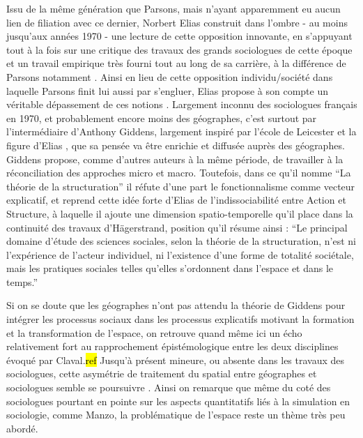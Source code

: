 Issu de la même génération que Parsons, mais n'ayant apparemment eu aucun lien de filiation avec ce dernier, Norbert Elias construit dans l'ombre - au moins jusqu'aux années 1970 - une lecture de cette opposition innovante, en s'appuyant tout à la fois sur une critique des travaux des grands sociologues de cette époque et un travail empirique très fourni tout au long de sa carrière, à la différence de Parsons notamment \autocite{Mennell1989}. Ainsi en lieu de cette opposition individu/société dans laquelle Parsons finit lui aussi par s'engluer, Elias propose à son compte un véritable dépassement de ces notions \autocite[94-101]{Heinich2002}. Largement inconnu des sociologues français en 1970, et probablement encore moins des géographes, c'est surtout par l'intermédiaire d'Anthony Giddens, largement inspiré par l'école de Leicester et la figure d'Elias \autocite[172-178]{Dunning2013}, que sa pensée va être enrichie et diffusée auprès des géographes. Giddens propose, comme d'autres auteurs à la même période, de travailler à la réconciliation des approches micro et macro. Toutefois, dans ce qu'il nomme \enquote{La théorie de la structuration} il réfute d'une part le fonctionnalisme comme vecteur explicatif, et reprend cette idée forte d'Elias de l'indissociabilité entre Action et Structure, à laquelle il ajoute une dimension spatio-temporelle qu'il place dans la continuité des travaux d'Hägerstrand, position qu'il résume ainsi : \enquote{Le principal domaine d’étude des sciences sociales, selon la théorie de la structuration, n’est ni l’expérience de l’acteur individuel, ni l’existence d’une forme de totalité sociétale, mais les pratiques sociales telles qu’elles s’ordonnent dans l’espace et dans le temps.} \autocite[2]{Giddens1984, Giddens1987}


Si on se doute que les géographes n'ont pas attendu la théorie de Giddens pour intégrer les processus sociaux dans les processus explicatifs motivant la formation et la transformation de l'espace, on retrouve quand même ici un écho relativement fort au rapprochement épistémologique entre les deux disciplines évoqué par Claval.\hl{ref} Jusqu'à présent mineure, ou absente dans les travaux des sociologues, cette asymétrie de traitement du spatial entre géographes et sociologues semble se poursuivre \autocite{Rhein2003}. Ainsi on remarque que même du coté des sociologues pourtant en pointe sur les aspects quantitatifs liés à la simulation en sociologie, comme Manzo, la problématique de l'espace reste un thème très peu abordé.

